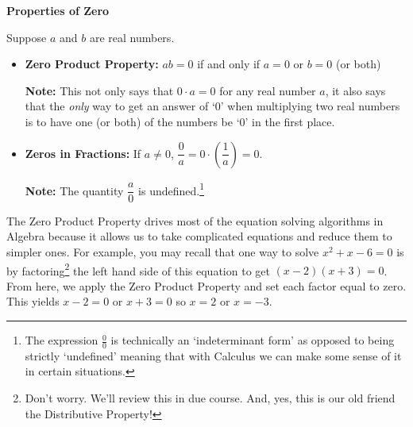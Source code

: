 \colorbox{ResultColor}{\bbm

\centerline{\textbf{Properties of Zero}}

Suppose $a$ and $b$ are real numbers.

\begin{itemize}

\item  \textbf{Zero Product Property:} $ab = 0$ if and only if $a=0$ or $b=0$ (or both)

\textbf{Note:} This not only says that $0 \cdot a = 0$ for any real number $a$, it also says that the \textit{only} way to get an answer of `$0$' when multiplying two real numbers  is to have one (or both) of the numbers be `$0$' in the first place.

\item  \textbf{Zeros in Fractions:}  If $a \neq 0$, $\dfrac{0}{a} = 0 \cdot \left(\dfrac{1}{a}\right) = 0$.

\textbf{Note:}  The quantity $\dfrac{a}{0}$ is undefined.\footnote{The expression $\frac{0}{0}$ is technically an `indeterminant form' as opposed to being strictly `undefined' meaning that with Calculus we can make some sense of it in certain situations.  }

\end{itemize}

\ebm}


The Zero Product Property drives most of the equation solving algorithms in Algebra because it allows us to take complicated equations and reduce them to simpler ones.  For example, you may recall that one way to solve  $x^2+x-6=0$ is by factoring\footnote{Don't worry.  We'll review this in due course.  And, yes, this is our old friend the Distributive Property!} the left hand side of this equation to get  $(x-2)(x+3) = 0$.  From here, we apply the Zero Product Property and set each factor equal to zero.  This yields  $x-2=0$ or $x+3=0$ so $x=2$ or $x=-3$.  

\medskip

